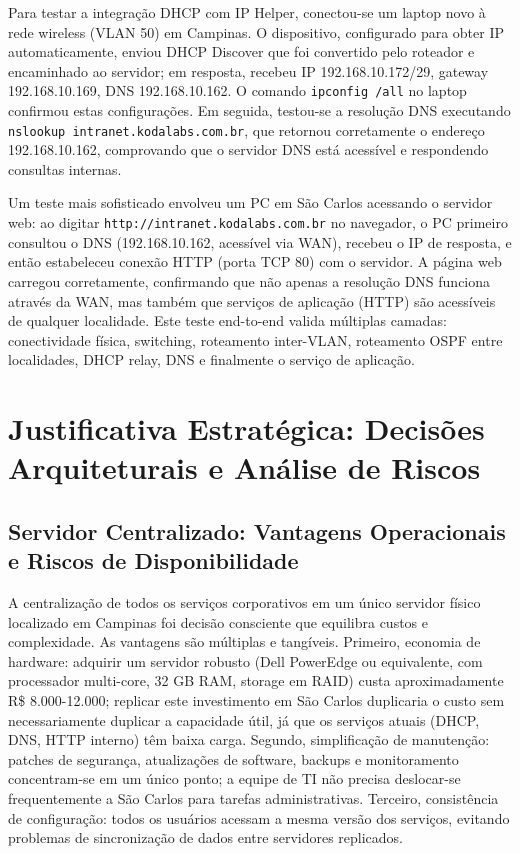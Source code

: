 \documentclass[12pt,a4paper]{article}
\begin{document}
Para testar a integração DHCP com IP Helper, conectou-se um laptop novo à rede wireless (VLAN 50) em Campinas. O dispositivo, configurado para obter IP automaticamente, enviou DHCP Discover que foi convertido pelo roteador e encaminhado ao servidor; em resposta, recebeu IP 192.168.10.172/29, gateway 192.168.10.169, DNS 192.168.10.162. O comando \texttt{ipconfig /all} no laptop confirmou estas configurações. Em seguida, testou-se a resolução DNS executando \texttt{nslookup intranet.kodalabs.com.br}, que retornou corretamente o endereço 192.168.10.162, comprovando que o servidor DNS está acessível e respondendo consultas internas.

Um teste mais sofisticado envolveu um PC em São Carlos acessando o servidor web: ao digitar \texttt{http://intranet.kodalabs.com.br} no navegador, o PC primeiro consultou o DNS (192.168.10.162, acessível via WAN), recebeu o IP de resposta, e então estabeleceu conexão HTTP (porta TCP 80) com o servidor. A página web carregou corretamente, confirmando que não apenas a resolução DNS funciona através da WAN, mas também que serviços de aplicação (HTTP) são acessíveis de qualquer localidade. Este teste end-to-end valida múltiplas camadas: conectividade física, switching, roteamento inter-VLAN, roteamento OSPF entre localidades, DHCP relay, DNS e finalmente o serviço de aplicação.

\section{Justificativa Estratégica: Decisões Arquiteturais e Análise de Riscos}

\subsection{Servidor Centralizado: Vantagens Operacionais e Riscos de Disponibilidade}

A centralização de todos os serviços corporativos em um único servidor físico localizado em Campinas foi decisão consciente que equilibra custos e complexidade. As vantagens são múltiplas e tangíveis. Primeiro, economia de hardware: adquirir um servidor robusto (Dell PowerEdge ou equivalente, com processador multi-core, 32 GB RAM, storage em RAID) custa aproximadamente R\$ 8.000-12.000; replicar este investimento em São Carlos duplicaria o custo sem necessariamente duplicar a capacidade útil, já que os serviços atuais (DHCP, DNS, HTTP interno) têm baixa carga. Segundo, simplificação de manutenção: patches de segurança, atualizações de software, backups e monitoramento concentram-se em um único ponto; a equipe de TI não precisa deslocar-se frequentemente a São Carlos para tarefas administrativas. Terceiro, consistência de configuração: todos os usuários acessam a mesma versão dos serviços, evitando problemas de sincronização de dados entre servidores replicados.
\end{document}
